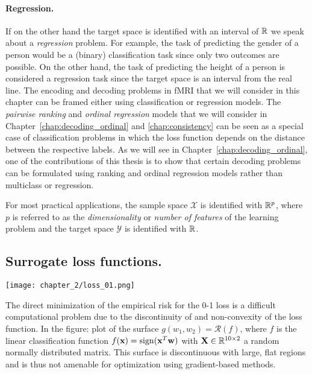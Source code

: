 \paragraph{Regression.} If on the other hand the target space is identified with an interval of ${\mathbb R}$ we speak about a \emph{regression} problem. For example, the task of predicting the gender of a person would be a (binary) classification task since only two outcomes are possible. On the other hand, the task of predicting the height of a person is considered a regression task since the target space is an interval from the real line. The encoding and decoding problems in fMRI that we will consider in this chapter can be framed either using classification or regression models. The \emph{pairwise ranking} and \emph{ordinal regression} models that we will consider in Chapter~\ref{chap:decoding_ordinal} and \ref{chap:consistency} can be seen as a special case of classification problems in which the loss function depends on the distance between the respective labels. As we will see in Chapter~\ref{chap:decoding_ordinal}, one of the contributions of this thesis is to show that certain decoding problems can be formulated using ranking and ordinal regression models rather than multiclass or regression. 

For most practical applications, the sample space $\mathcal{X}$ is identified with ${\mathbb R}^p$, where $p$ is referred to as the \emph{dimensionality} or \emph{number of features} of the learning problem and the target space $\mathcal{Y}$ is identified with ${\mathbb R}$.




\subsection{Surrogate loss functions.}\label{subsec:surrogate_loss_functions}

\begin{marginfigure}[2cm]
\hspace{-20pt}\texttt{[image: chapter\_2/loss\_01.png]}
\vspace{-10pt}\caption{
	The direct minimization of the empirical risk for the 0-1 loss is a difficult computational problem due to the discontinuity of and non-convexity of the loss function. In the figure: plot of the surface $g(w_1, w_2) = \mathcal{R}(f)$, where $f$ is the linear classification function $f(\mathbf{x}) = \operatorname*{sign}(\mathbf{x}^T \mathbf{w})$ with $\mathbf{X} \in {\mathbb R}^{10 \times 2}$ a random normally distributed matrix.
	This surface is discontinuous with large, flat regions and is thus not amenable for optimization using gradient-based methods.
}\label{fig:01_minimization}
\end{marginfigure}


